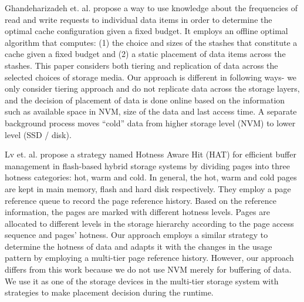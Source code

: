 Ghandeharizadeh et. al. \cite{c2} propose a way to use knowledge about the frequencies of read and write requests to individual data items in order to determine the optimal cache configuration given a fixed budget. It employs an offline optimal algorithm that computes: (1) the choice and sizes of the stashes that constitute a cache given a fixed budget and (2) a static placement of data items across the stashes. This paper considers both tiering and replication of data across the selected choices of storage media. Our approach is different in following ways- we only consider tiering approach and do not replicate data across the storage layers, and the decision of placement of data is done online based on the information such as available space in NVM, size of the data and last access time. A separate background process moves “cold” data from higher storage level (NVM) to lower level (SSD / disk). 

Lv et. al. \cite{c1} propose a strategy named Hotness Aware Hit (HAT) for efficient buffer management in flash-based hybrid storage systems by dividing pages into three hotness categories: hot, warm and cold. In general, the hot, warm and cold pages are kept in main memory, flash and hard disk respectively. They employ a page reference queue to record the page reference history. Based on the reference information, the pages are marked with different hotness levels. Pages are allocated to different levels in the storage hierarchy according to the page access sequence and pages’ hotness. Our approach employs a similar strategy to determine the hotness of data and adapts it with the changes in the usage pattern by employing a multi-tier page reference history. However, our approach differs from this work because we do not use NVM merely for buffering of data. We use it as one of the storage devices in the multi-tier storage system with strategies to make placement decision during the runtime.